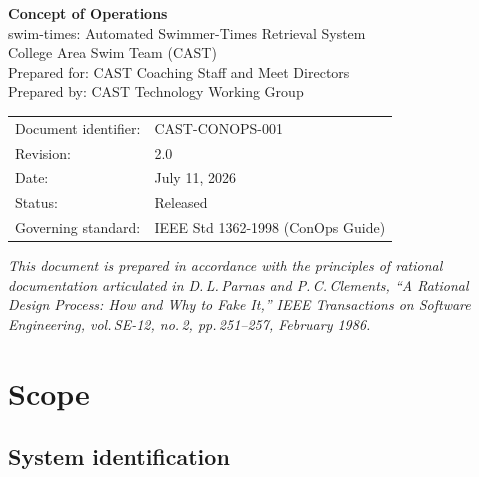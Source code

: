 \documentclass[12pt]{article}
\begin{document}
\begin{titlepage}
  \centering
  \vspace*{2cm}
  {\Huge\bfseries\color{castblue} Concept of Operations\\[0.5em]}
  {\Large swim-times: Automated Swimmer-Times Retrieval System}\\[2em]
  {\large College Area Swim Team (CAST)}\\[0.5em]
  {\normalsize Prepared for: CAST Coaching Staff and Meet Directors}\\[0.5em]
  {\normalsize Prepared by: CAST Technology Working Group}\\[2em]
  \begin{tabular}{ll}
    Document identifier: & CAST-CONOPS-001                  \\
    Revision:            & 2.0                               \\
    Date:                & July 11, 2026                     \\
    Status:              & Released                          \\
    Governing standard:  & IEEE Std 1362-1998 (ConOps Guide) \\
  \end{tabular}
  \vfill
  {\small\textit{This document is prepared in accordance with the principles of
  rational documentation articulated in D.\,L.\,Parnas and P.\,C.\,Clements,
  ``A Rational Design Process: How and Why to Fake It,''
  \textit{IEEE Transactions on Software Engineering}, vol.\,SE-12, no.\,2,
  pp.\,251--257, February 1986.}}
\end{titlepage}

\tableofcontents
\clearpage

\section{Scope}

\subsection{System identification}
\end{document}
